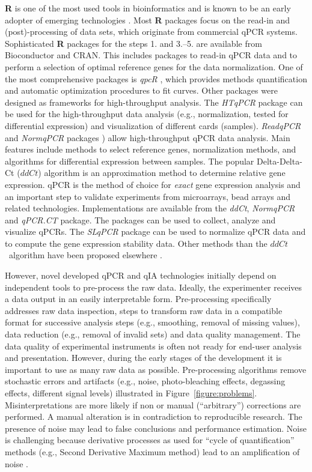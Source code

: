 \documentclass[twocolumn]{bmcart}%
\begin{document}
  \textbf{R} is one of the most used tools in bioinformatics and is known to be 
an early adopter of emerging technologies \cite{pabinger_2014}. Most \textbf{R} 
packages focus on the read-in and (post)-processing of data sets, which 
originate from commercial qPCR systems. Sophisticated 
\textbf{R} packages for the steps 1. and 3.--5. are available 
from Bioconductor and CRAN. This includes packages to read-in qPCR data and to 
perform a selection of optimal reference genes for the data normalization. One 
of the most comprehensive packages is \emph{qpcR} \cite{ritz_2008}, which 
provides methods quantification and automatic optimization procedures to fit 
curves. Other packages were designed as frameworks for high-throughput 
analysis. The \emph{HTqPCR} package \cite{Dvinge_2009} can be used for the 
high-throughput data analysis (e.g., normalization, tested for differential 
expression) and visualization of different cards (samples). \emph{ReadqPCR} and 
\emph{NormqPCR} packages \cite{perkins_2012}) allow high-throughput qPCR data 
analysis. Main features include methods to select reference genes, 
normalization methods, and algorithms for differential expression between 
samples. The popular Delta-Delta-Ct ($ddCt$) algorithm \cite{livak_2001} is an 
approximation method to determine relative gene expression. qPCR is the method 
of choice for \emph{exact} gene expression analysis and an important step to 
validate experiments from microarrays, bead arrays and related technologies. 
Implementations are available from the \emph{ddCt}, \emph{NormqPCR} and 
\emph{qPCR.CT} package. The packages can be used to collect, analyze and 
visualize qPCRs. The \emph{SLqPCR} package can be used to normalize qPCR data 
and to compute the gene expression stability data. Other methods than the 
$ddCt$~algorithm have been proposed elsewhere \cite{heckmann_2011}.

However, novel developed qPCR and qIA technologies initially depend on 
independent tools to pre-process the raw data. Ideally, the experimenter 
receives a data output in an 
easily interpretable form. Pre-processing specifically addresses raw data 
inspection, steps to transform raw data in a compatible format for successive 
analysis steps (e.g., smoothing, removal of missing values), data reduction 
(e.g., removal of invalid sets) and data quality management. The data quality of 
experimental instruments is often not ready for end-user analysis and 
presentation. However, during the early stages of the development it is 
important to use as many raw data as possible. Pre-processing algorithms remove 
stochastic errors and artifacts (e.g., noise, photo-bleaching effects, degassing 
effects, different signal levels) illustrated in Figure~\ref{figure:problems}. 
Misinterpretations are more likely if non or manual (``arbitrary'') corrections 
are performed. A manual alteration is in contradiction to reproducible research. 
The presence of noise may lead to false conclusions and performance estimation. 
Noise is challenging because derivative processes as used for ``cycle of 
quantification'' methods (e.g., Second Derivative Maximum method) lead to an 
amplification of noise \cite{roediger_RJ_2013, larionov_2005, tuomi_2010, 
ruijter_2013, tellinghuisen_2014}.
\end{document}
